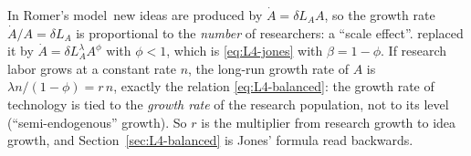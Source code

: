 \begin{beyond}
In Romer's model\,\citep{romer1990} new ideas are produced by $\dot A=\delta L_AA$, so the growth rate $\dot A/A=\delta L_A$ is proportional to the \emph{number} of researchers: a ``scale effect''. \citet{jones1995} replaced it by $\dot A=\delta L_A^{\lambda}A^{\phi}$ with $\phi<1$, which is \eqref{eq:L4-jones} with $\beta=1-\phi$. If research labor grows at a constant rate $n$, the long-run growth rate of $A$ is $\lambda n/(1-\phi)=r\,n$, exactly the relation \eqref{eq:L4-balanced}: the growth rate of technology is tied to the \emph{growth rate} of the research population, not to its level (``semi-endogenous'' growth). So $r$ is the multiplier from research growth to idea growth, and Section~\ref{sec:L4-balanced} is Jones' formula read backwards.
\end{beyond}

